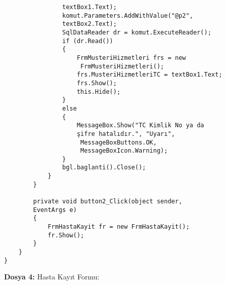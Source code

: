 \begin{lstlisting}
                textBox1.Text);
                komut.Parameters.AddWithValue("@p2", 
                textBox2.Text);
                SqlDataReader dr = komut.ExecuteReader();
                if (dr.Read())
                {
                    FrmMusteriHizmetleri frs = new
                     FrmMusteriHizmetleri();
                    frs.MusteriHizmetleriTC = textBox1.Text;
                    frs.Show();
                    this.Hide();
                }
                else
                {
                    MessageBox.Show("TC Kimlik No ya da 
                    şifre hatalıdır.", "Uyarı", 
                     MessageBoxButtons.OK, 
                     MessageBoxIcon.Warning);
                }
                bgl.baglanti().Close();
            }
        }

        private void button2_Click(object sender, 
        EventArgs e)
        {
            FrmHastaKayit fr = new FrmHastaKayit();
            fr.Show();
        }
    }
}

\end{lstlisting}

\textbf{Dosya 4:} Hasta Kayıt Formu:

